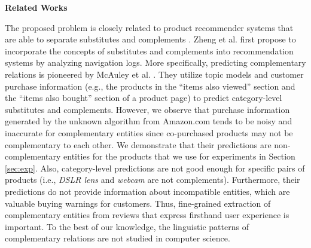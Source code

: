 

\textbf{Related Works}
\label{sec:rw}

The proposed problem is closely related to product recommender systems that are able to separate substitutes and complements  \cite{McAPanLes15,zheng2009substitutes}. Zheng et al. \cite{zheng2009substitutes} first propose to incorporate the concepts of substitutes and complements into recommendation systems by analyzing navigation logs. More specifically, predicting complementary relations is pioneered by McAuley et al. \cite{McAPanLes15}. They utilize topic models and customer purchase information (e.g., the products in the ``items also viewed'' section and the ``items also bought'' section of a product page) to predict category-level substitutes and complements. However, we observe that purchase information generated by the unknown algorithm from Amazon.com tends to be noisy and inaccurate for complementary entities since co-purchased products may not be complementary to each other. We demonstrate that their predictions are non-complementary entities for the products that we use for experiments in Section \ref{sec:exp}. Also, category-level predictions are not good enough for specific pairs of products (i.e., \textit{DSLR lens} and \textit{webcam} are not complements). Furthermore, their predictions do not provide information about incompatible entities, which are valuable buying warnings for customers. Thus, fine-grained extraction of complementary entities from reviews that express firsthand user experience is important. To the best of our knowledge, the linguistic patterns of complementary relations are not studied in computer science.

